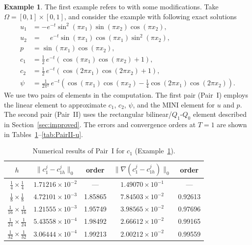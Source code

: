 \documentclass[a4paper,fleqn]{cas-sc}
\numberwithin{equation}{section}
\theoremstyle{definition}
\newtheorem{example}[theorem]{Example}
\begin{document}
\begin{example}
\label{ex:1}
The first example refers to \cite{Gao2017} with some modifications. Take
$\Omega = [0,1]\times[0,1]$, and consider the example with following exact solutions
\begin{align}
  u_{1} &= -e^{-t}\sin^{2}(\pi x_{1})\sin(\pi x_{2})\cos(\pi x_{2}),
  \label{eq:6.1}\\
  u_{2} &= \phantom{-}e^{-t}\sin(\pi x_{1})\cos(\pi x_{1})\sin^{2}(\pi x_{2}),
  \label{eq:6.2}\\
  p     &= \sin(\pi x_{1})\cos(\pi x_{2}),
  \label{eq:6.3}\\
  c_{1} &= \frac{1}{2}\,e^{-t}\!\left(\cos(\pi x_{1})\cos(\pi x_{2}) + 1\right),
  \label{eq:6.4}\\
  c_{2} &= \frac{1}{2}\,e^{-t}\!\left(\cos(2\pi x_{1})\cos(2\pi x_{2}) + 1\right),
  \label{eq:6.5}\\
  \psi  &= \frac{1}{2\pi^{2}}\,e^{-t}\!\left(
             \cos(\pi x_{1})\cos(\pi x_{2})
             - \frac{1}{4}\cos(2\pi x_{1})\cos(2\pi x_{2})
           \right).
  \label{eq:6.6}
\end{align}
We use two pairs of elements in the computation. The first pair (Pair~I) employs the linear
element to approximate $c_{1}$, $c_{2}$, $\psi$, and the MINI element for $u$ and $p$. The
second pair (Pair~II) uses the rectangular bilinear/$Q_{1}$-$Q_{0}$ element described in
Section~\ref{sec:improved}. The errors and convergence orders at $T = 1$ are shown in
Tables~\ref{tab:PairI-c1}--\ref{tab:PairII-u}.
\end{example}


\begin{table}[htbp]
\centering
\caption{Numerical results of Pair~I for $c_{1}$ (Example~\ref{ex:1}).}
\label{tab:PairI-c1}
\begin{tabular}{ccccc}
\hline
$h$ &
$\|c_{1}^{j} - c_{1h}^{j}\|_{0}$ & order &
$\|\nabla(c_{1}^{j} - c_{1h}^{j})\|_{0}$ & order \\
\hline
$\tfrac{1}{4} \times \tfrac{1}{4}$   & $1.71216\times10^{-2}$ & ---     & $1.49070\times10^{-1}$ & ---     \\
$\tfrac{1}{8} \times \tfrac{1}{8}$   & $4.72101\times10^{-3}$ & 1.85865 & $7.84503\times10^{-2}$ & 0.92613 \\
$\tfrac{1}{16}\times \tfrac{1}{16}$  & $1.21555\times10^{-3}$ & 1.95749 & $3.98565\times10^{-2}$ & 0.97696 \\
$\tfrac{1}{24}\times \tfrac{1}{24}$  & $5.43558\times10^{-4}$ & 1.98492 & $2.66612\times10^{-2}$ & 0.99165 \\
$\tfrac{1}{32}\times \tfrac{1}{32}$  & $3.06444\times10^{-4}$ & 1.99213 & $2.00212\times10^{-2}$ & 0.99559 \\
\hline
\end{tabular}
\end{table}
\end{document}
